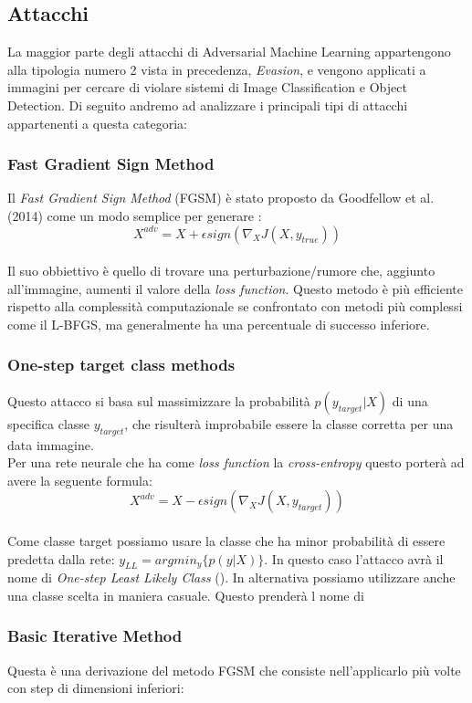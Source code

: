 \subsection{Attacchi}
La maggior parte degli attacchi di Adversarial Machine Learning appartengono alla tipologia numero 2 \cite{adversarial} vista in precedenza, \textit{Evasion}, e vengono applicati a immagini per cercare di violare sistemi di Image Classification e Object Detection. 
Di seguito andremo ad analizzare i principali tipi di attacchi appartenenti a questa categoria:

\subsubsection{Fast Gradient Sign Method}
Il \textit{Fast Gradient Sign Method} (FGSM) è stato proposto da Goodfellow et al. (2014) come un modo semplice per generare :
\[X^{adv} = X + \epsilon sign(\nabla_XJ(X, y_{true}))\]
\\
Il suo obbiettivo è quello di trovare una perturbazione/rumore che, aggiunto all'immagine, aumenti il valore della \textit{loss function}.
Questo metodo è più efficiente rispetto alla complessità computazionale se confrontato con metodi più complessi come il L-BFGS, ma generalmente ha una percentuale di successo inferiore.

\subsubsection{One-step target class methods}
Questo attacco si basa sul massimizzare la probabilità \(p(y_{target} | X)\) di una specifica classe \(y_{target}\), che risulterà improbabile essere la classe corretta per una data immagine.\\
Per una rete neurale che ha come \textit{loss function} la \textit{cross-entropy} questo porterà ad avere la seguente formula:
\[X^{adv} = X - \epsilon sign(\nabla_XJ(X, y_{target}))\]
\\
Come classe target possiamo usare la classe che ha minor probabilità di essere predetta dalla rete: \(y_{LL} = arg min_y\{p(y | X)\}\). In questo caso l'attacco avrà il nome di \textit{One-step Least Likely Class} (). In alternativa possiamo utilizzare anche una classe scelta in maniera casuale. Questo prenderà l nome di 

\subsubsection{Basic Iterative Method}
Questa è una derivazione del metodo FGSM che consiste nell'applicarlo più volte con step di dimensioni inferiori:


